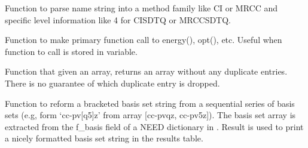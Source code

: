 \documentclass[letterpaper,10pt,english]{sphinxmanual}
\begin{document}

\begin{fulllineitems}
\label{index:driver.parse_arbitrary_order}
Function to parse name string into a method family like CI or MRCC and specific
level information like 4 for CISDTQ or MRCCSDTQ.

\end{fulllineitems}

\label{index:module-wrappers}

\begin{fulllineitems}
\label{index:wrappers.call_function_in_1st_argument}
Function to make primary function call to energy(), opt(), etc.
Useful when function to call is stored in variable.

\end{fulllineitems}


\begin{fulllineitems}
\label{index:wrappers.drop_duplicates}
Function that given an array, returns an array without any duplicate
entries. There is no guarantee of which duplicate entry is dropped.

\end{fulllineitems}


\begin{fulllineitems}
\label{index:wrappers.n_body}
\end{fulllineitems}


\begin{fulllineitems}
\label{index:wrappers.reconstitute_bracketed_basis}
Function to reform a bracketed basis set string from a sequential series
of basis sets (e.g, form `cc-pv{[}q5{]}z' from array {[}cc-pvqz, cc-pv5z{]}). The
basis set array is extracted from the f\_basis field of a NEED dictionary in
{\hyperref[index:wrappers.complete_basis_set]{}}. Result is used to print a nicely
formatted basis set string in the results table.

\end{fulllineitems}
\end{document}
